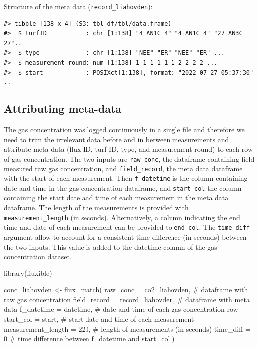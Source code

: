 \documentclass[
  letterpaper,
  DIV=11,
  numbers=noendperiod]{scrartcl}
\newenvironment{Shaded}{\begin{snugshade}}{\end{snugshade}}
\newcommand{\AttributeTok}[1]{\textcolor[rgb]{0.40,0.45,0.13}{#1}}
\newcommand{\CommentTok}[1]{\textcolor[rgb]{0.37,0.37,0.37}{#1}}
\newcommand{\DecValTok}[1]{\textcolor[rgb]{0.68,0.00,0.00}{#1}}
\newcommand{\FunctionTok}[1]{\textcolor[rgb]{0.28,0.35,0.67}{#1}}
\newcommand{\NormalTok}[1]{\textcolor[rgb]{0.00,0.23,0.31}{#1}}
\newcommand{\OtherTok}[1]{\textcolor[rgb]{0.00,0.23,0.31}{#1}}
\begin{document}
Structure of the meta data (\texttt{record\_liahovden}):

\begin{verbatim}
#> tibble [138 x 4] (S3: tbl_df/tbl/data.frame)
#>  $ turfID           : chr [1:138] "4 AN1C 4" "4 AN1C 4" "27 AN3C 27"..
#>  $ type             : chr [1:138] "NEE" "ER" "NEE" "ER" ...
#>  $ measurement_round: num [1:138] 1 1 1 1 1 1 2 2 2 2 ...
#>  $ start            : POSIXct[1:138], format: "2022-07-27 05:37:30" ..
\end{verbatim}

\subsection{Attributing meta-data}\label{attributing-meta-data}

The gas concentration was logged continuously in a single file and
therefore we need to trim the irrelevant data before and in between
measurements and attribute meta data (flux ID, turf ID, type, and
measurement round) to each row of gas concentration. The two inputs are
\texttt{raw\_conc}, the dataframe containing field measured raw gas
concentration, and \texttt{field\_record}, the meta data dataframe with
the start of each measurement. Then \texttt{f\_datetime} is the column
containing date and time in the gas concentration dataframe, and
\texttt{start\_col} the column containing the start date and time of
each measurement in the meta data dataframe. The length of the
measurements is provided with \texttt{measurement\_length} (in seconds).
Alternatively, a column indicating the end time and date of each
measurement can be provided to \texttt{end\_col}. The
\texttt{time\_diff} argument allow to account for a consistent time
difference (in seconds) between the two inputs. This value is added to
the datetime column of the gas concentration dataset.

\begin{Shaded}
\begin{Highlighting}[]
\FunctionTok{library}\NormalTok{(fluxible)}

\NormalTok{conc\_liahovden }\OtherTok{\textless{}{-}} \FunctionTok{flux\_match}\NormalTok{(}
  \AttributeTok{raw\_conc =}\NormalTok{ co2\_liahovden, }\CommentTok{\# dataframe with raw gas concentration}
  \AttributeTok{field\_record =}\NormalTok{ record\_liahovden, }\CommentTok{\# dataframe with meta data}
  \AttributeTok{f\_datetime =}\NormalTok{ datetime, }\CommentTok{\# date and time of each gas concentration row}
  \AttributeTok{start\_col =}\NormalTok{ start, }\CommentTok{\# start date and time of each measurement}
  \AttributeTok{measurement\_length =} \DecValTok{220}\NormalTok{, }\CommentTok{\# length of measurements (in seconds)}
  \AttributeTok{time\_diff =} \DecValTok{0} \CommentTok{\# time difference between f\_datetime and start\_col}
\NormalTok{)}
\end{Highlighting}
\end{Shaded}
\end{document}
